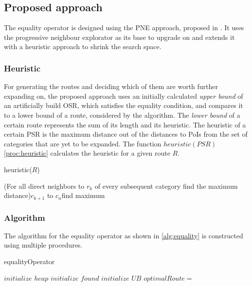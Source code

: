 \subsection{Proposed approach} 
\label{sec:approachEO}
The equality operator is designed using the PNE approach, proposed in \cite{OSR}. It uses the progressive neighbour explorator as its base to upgrade on and extends it with a heuristic approach to shrink the search space.

\subsubsection{Heuristic}
For generating the routes and deciding which of them are worth further expanding on, the proposed approach uses an initially calculated \textit{upper bound} of an artificially build OSR, which satisfies the equality condition, and compares it to a lower bound of a route, considered by the algorithm. The \textit{lower bound} of a certain route represents the sum of its length and its heuristic. The heuristic of a certain PSR is the maximum distance out of the distances to PoIs from the set of categories that are yet to be expanded. The function $heuristic(PSR)$ \ref{proc:heuristic} calculates the heuristic for a given route $R$.

\begin{function}[H]
	\label{proc:heuristic}
	\caption{heuristic($R$)}
	\For(For all direct neighbors to $r_k$ of every subsequent category find the maximum distance){$c_{k+1}$ to $c_n$}{find maximum\;}
\end{function}

\subsubsection{Algorithm}

The algorithm for the equality operator as shown in \ref{alg:equality} is constructed using multiple procedures.

\begin{algorithm}[H]
	\label{alg:equality}
	\caption{equalityOperator}
	
	
	\BlankLine
	
	$initialize$ $heap$ 
	$initialize$ $found$ 
	$initialize$ $UB$\; 
	$optimalRoute =$\;
	{
		\dummySR{}\;
		\modifiedPNE{}\;
	}
\end{algorithm}


